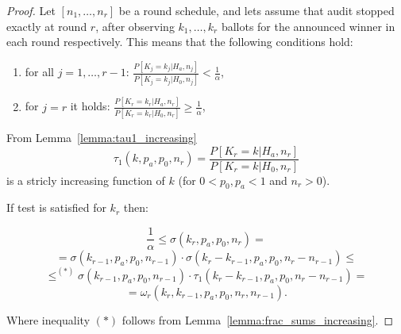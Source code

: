 \begin{proof}
 Let $[n_1, \ldots, n_r]$ be a round schedule, and  lets assume that \R \BRAVO audit stopped exactly at
 round $r$, 
 after observing $k_1, \ldots, k_r$ ballots for the announced winner in each round respectively. This means that
 the following conditions hold:
 \begin{enumerate}
  \item for all $j = 1, \ldots, r-1$: 
  $\frac{P[{K_j = k_{j}} | H_a, n_j]}{P[K_j = {k_{j}} | H_0, n_j]} < \frac{1}{\alpha}$,
  \item for $j = r$ it holds: %
  $\frac{P[{K_r = k_{r}} | H_a, n_r]}{P[K_r = {k_{r}} | H_0, n_r]} \geq \frac{1}{\alpha}$,
 \end{enumerate}
 
 From Lemma~\ref{lemma:tau1_increasing} 
 \[
 \tau_1(k, p_a, p_0, n_r) = 
  \frac{P[K_r = {k} | H_a, n_r]}{P[K_r = {k} | H_0, n_r]}
 \]
is a stricly increasing function of $k$ (for $0 < p_0, p_a < 1$ and $n_r > 0$). %

If \BRAVO test is satisfied for $k_r$ then:

\[
 \frac{1}{\alpha} \leq \sigma(k_{r}, p_a, p_0, n_{r}) =
\]
\[
 = \sigma(k_{r-1}, p_a, p_0, n_{r-1}) \cdot \sigma(k_r - k_{r-1}, p_a, p_0, n_r - n_{r-1})  \leq
\]
\[
 \leq^{(*)} \sigma(k_{r-1}, p_a, p_0, n_{r-1}) \cdot \tau_1(k_r - k_{r-1}, p_a, p_0, n_r - n_{r-1}) =
\]
\[
 = \omega_r(k_r, k_{r-1}, p_a, p_0, n_r, n_{r-1}).
\]

Where inequality $(*)$ follows from Lemma~\ref{lemma:frac_sums_increasing}.



\end{proof}

